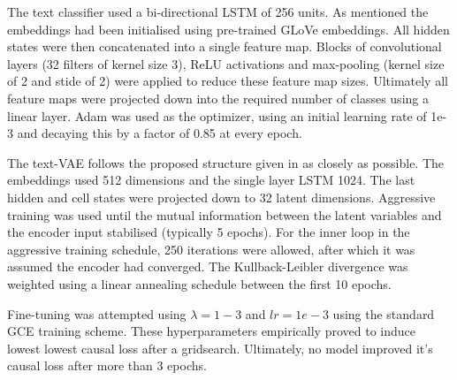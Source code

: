 The text classifier used a bi-directional LSTM of 256 units. As mentioned the embeddings had been initialised using pre-trained GLoVe embeddings. All hidden states were then concatenated into a single feature map. Blocks of convolutional layers (32 filters of kernel size 3), ReLU activations and max-pooling (kernel size of 2 and stide of 2) were applied to reduce these feature map sizes. Ultimately all feature maps were projected down into the required number of classes using a linear layer. Adam was used as the optimizer, using an initial learning rate of 1e-3 and decaying this by a factor of 0.85 at every epoch.

The text-VAE follows the proposed structure given in \cite{he2019lagging} as closely as possible. The embeddings used 512 dimensions and the single layer LSTM 1024. The last hidden and cell states were projected down to 32 latent dimensions. Aggressive training was used until the mutual information between the latent variables and the encoder input stabilised (typically 5 epochs). For the inner loop in the aggressive training schedule, 250 iterations were allowed, after which it was assumed the encoder had converged. The Kullback-Leibler divergence was weighted using a linear annealing schedule between the first 10 epochs. 

Fine-tuning was attempted using $\lambda=1-3$ and $lr=1e-3$ using the standard GCE training scheme. These hyperparameters empirically proved to induce lowest lowest causal loss after a gridsearch. Ultimately, no model improved it's causal loss after more than 3 epochs.

\newpage
